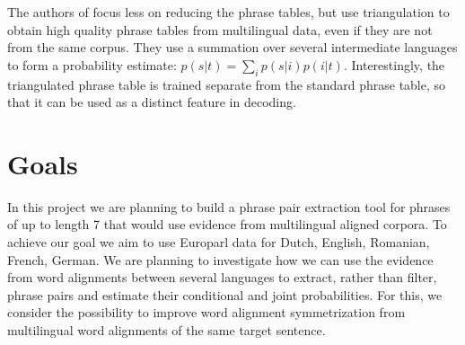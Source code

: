 \documentclass[11pt]{article}
\begin{document}
The authors of \cite{cohn} focus less on reducing the phrase tables, but use triangulation to obtain high quality phrase tables from multilingual data, even if they are not from the same corpus. They use a summation over several intermediate languages to form a probability estimate: $p(s|t)=\sum_i p(s|i)p(i|t)$. Interestingly, the triangulated phrase table is trained separate from the standard phrase table, so that it can be used as a distinct feature in decoding.

\section{Goals}

In this project we are planning to build a phrase pair extraction tool for phrases of up to length 7 that would use evidence from multilingual aligned corpora. To achieve our goal we aim to use Europarl %
data for Dutch, English, Romanian, French, German. %
We are planning to investigate how we can use the evidence from word alignments between several languages to extract, rather than filter, phrase pairs and estimate their conditional and joint probabilities. For this, we consider the possibility to improve word alignment symmetrization from multilingual word alignments of the same target sentence.
\end{document}
